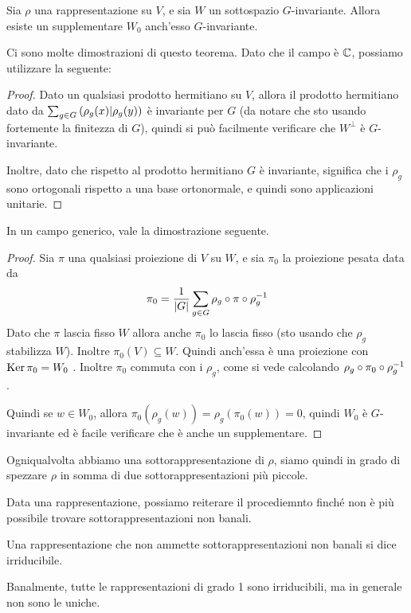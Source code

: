 	\begin{mytheorem}[Maschke]\label{Th:SupplInv}
		Sia $\rho$ una rappresentazione su $V$, e sia $W$ un sottospazio $G$-invariante. Allora esiste un supplementare $W_0$ anch'esso $G$-invariante.
	\end{mytheorem}
	
	Ci sono molte dimostrazioni di questo teorema. Dato che il campo è $\mathbb C$, possiamo utilizzare la seguente:
	\begin{proof}
		Dato un qualsiasi prodotto hermitiano su $V$, allora il prodotto hermitiano dato da $\sum_{g\in G}\left(\rho_g(x) | \rho_g(y)\right)$ è invariante per $G$ (da notare che sto usando fortemente la finitezza di $G$), quindi si può facilmente verificare che $W^\perp$ è $G$-invariante.
		
		Inoltre, dato che rispetto al prodotto hermitiano $G$ è invariante, significa che i $\rho_g$ sono ortogonali rispetto a una base ortonormale, e quindi sono applicazioni unitarie.
	\end{proof}

	In un campo generico, vale la dimostrazione seguente.
	\begin{proof}
		Sia $\pi$ una qualsiasi proiezione di $V$ su $W$, e sia $\pi_0$ la proiezione pesata data da
		\[
		\pi_0=\frac1{\left|G\right|} \sum_{g\in G} \rho_g \circ \pi \circ \rho_g^{-1}
		\]
		Dato che $\pi$ lascia fisso $W$ allora anche $\pi_0$ lo lascia fisso (sto usando che $\rho_g$ stabilizza $W$). Inoltre $\pi_0(V) \subseteq W$. Quindi anch'essa è una proiezione con $\operatorname{Ker} \pi_0=W_0$ . Inoltre $\pi_0$ commuta con i $\rho_g$, come si vede calcolando $\rho_g \circ \pi_0 \circ \rho_g^{-1}$.
		
		Quindi se $w\in W_0$, allora $\pi_0 (\rho_g(w))=\rho_g(\pi_0(w))=0$, quindi $W_0$ è $G$-invariante ed è facile verificare che è anche un supplementare.
	\end{proof}

	Ogniqualvolta abbiamo una sottorappresentazione di $\rho$, siamo quindi in grado di spezzare $\rho$ in somma di due sottorappresentazioni più piccole. 

	Data una rappresentazione, possiamo reiterare il procediemnto finché non è più possibile trovare sottorappresentazioni non banali.

	\begin{mydef}
		Una rappresentazione che non ammette sottorappresentazioni non banali si dice irriducibile.
	\end{mydef}

	Banalmente, tutte le rappresentazioni di grado 1 sono irriducibili, ma in generale non sono le uniche.

